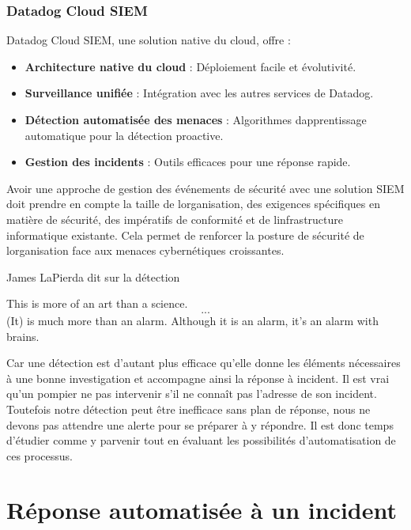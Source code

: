 \documentclass[
  11pt,
  a4paper,
  krantz2,
  11pt,
  oneside]{krantz}
\renewenvironment{quote}{\begin{VF}}{\end{VF}}
\begin{document}
\subsubsection{Datadog Cloud SIEM}\label{datadog-cloud-siem}

Datadog Cloud SIEM, une solution native du cloud, offre :

\begin{itemize}
\item
  \textbf{Architecture native du cloud} : Déploiement facile et évolutivité.
\item
  \textbf{Surveillance unifiée} : Intégration avec les autres services de Datadog.
\item
  \textbf{Détection automatisée des menaces} : Algorithmes d\textquotesingle apprentissage automatique pour la détection proactive.
\item
  \textbf{Gestion des incidents} : Outils efficaces pour une réponse rapide.
\end{itemize}

Avoir une approche de gestion des événements de sécurité avec une solution SIEM doit prendre en compte la taille de l\textquotesingle organisation, des exigences spécifiques en matière de sécurité, des impératifs de conformité et de l\textquotesingle infrastructure informatique existante. Cela permet de renforcer la posture de sécurité de l\textquotesingle organisation face aux menaces cybernétiques croissantes.

James LaPierda dit sur la détection

\begin{quote}
This is more of an art than a science. \[...\] (It) is much more than an alarm. Although it is an alarm, it's an alarm with brains.
\end{quote}

Car une détection est d'autant plus efficace qu'elle donne les éléments nécessaires à une bonne investigation et accompagne ainsi la réponse à incident. Il est vrai qu'un pompier ne pas intervenir s'il ne connaît pas l'adresse de son incident. Toutefois notre détection peut être inefficace sans plan de réponse, nous ne devons pas attendre une alerte pour se préparer à y répondre. Il est donc temps d'étudier comme y parvenir tout en évaluant les possibilités d'automatisation de ces processus.

\section{Réponse automatisée à un incident}\label{ruxe9ponse-automatisuxe9e-uxe0-un-incident}
\end{document}
